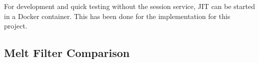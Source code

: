 \documentclass[../MasterThesis.tex]{subfiles}
\begin{document}
For development and quick testing without the session service, JIT can be started in a Docker container. This has been done for the implementation for this project.




%
%
%
%
%
%
%
%
%
%
%
%
%
%
%





\subsection{Melt Filter Comparison} \label{subsection:meltfilter}
\end{document}
